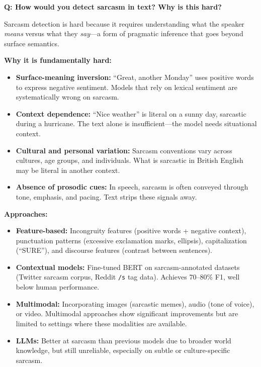 \begin{interviewq}
\textbf{Q: How would you detect sarcasm in text? Why is this hard?}

 \quad {} \quad \badgefreq{\freqlow}

\stronganswer
Sarcasm detection is hard because it requires understanding what the speaker \emph{means}
versus what they \emph{say}---a form of pragmatic inference that goes beyond surface
semantics.

\textbf{Why it is fundamentally hard:}
\begin{itemize}
    \item \textbf{Surface-meaning inversion:} ``Great, another Monday'' uses positive words
    to express negative sentiment.  Models that rely on lexical sentiment are systematically
    wrong on sarcasm.
    \item \textbf{Context dependence:} ``Nice weather'' is literal on a sunny day, sarcastic
    during a hurricane.  The text alone is insufficient---the model needs situational context.
    \item \textbf{Cultural and personal variation:} Sarcasm conventions vary across cultures,
    age groups, and individuals.  What is sarcastic in British English may be literal in
    another context.
    \item \textbf{Absence of prosodic cues:} In speech, sarcasm is often conveyed through
    tone, emphasis, and pacing.  Text strips these signals away.
\end{itemize}

\textbf{Approaches:}
\begin{itemize}
    \item \textbf{Feature-based:} Incongruity features (positive words + negative context),
    punctuation patterns (excessive exclamation marks, ellipsis), capitalization (``SURE''),
    and discourse features (contrast between sentences).
    \item \textbf{Contextual models:} Fine-tuned BERT on sarcasm-annotated datasets (Twitter
    sarcasm corpus, Reddit \texttt{/s} tag data).  Achieves 70--80\% F1, well below human
    performance.
    \item \textbf{Multimodal:} Incorporating images (sarcastic memes), audio (tone of voice),
    or video.  Multimodal approaches show significant improvements but are limited to
    settings where these modalities are available.
    \item \textbf{LLMs:} Better at sarcasm than previous models due to broader world knowledge,
    but still unreliable, especially on subtle or culture-specific sarcasm.
\end{itemize}


\end{interviewq}
